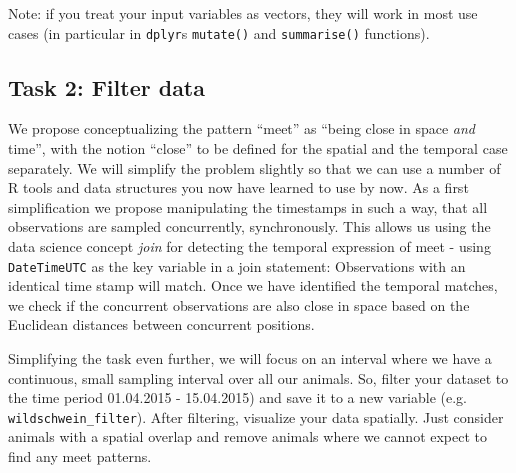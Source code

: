 \documentclass[]{book}
\newenvironment{Shaded}{\begin{snugshade}}{\end{snugshade}}
\newcommand{\DataTypeTok}[1]{\textcolor[rgb]{0.13,0.29,0.53}{#1}}
\newcommand{\FloatTok}[1]{\textcolor[rgb]{0.00,0.00,0.81}{#1}}
\newcommand{\KeywordTok}[1]{\textcolor[rgb]{0.13,0.29,0.53}{\textbf{#1}}}
\newcommand{\NormalTok}[1]{#1}
\newcommand{\OperatorTok}[1]{\textcolor[rgb]{0.81,0.36,0.00}{\textbf{#1}}}
\newcommand{\StringTok}[1]{\textcolor[rgb]{0.31,0.60,0.02}{#1}}
\begin{document}
Note: if you treat your input variables as vectors, they will work in most use cases (in particular in \texttt{dplyr}s \texttt{mutate()} and \texttt{summarise()} functions).

\hypertarget{task-2-filter-data}{%
\subsection{Task 2: Filter data}\label{task-2-filter-data}}

We propose conceptualizing the pattern ``meet'' as ``being close in space \emph{and} time'', with the notion ``close'' to be defined for the spatial and the temporal case separately. We will simplify the problem slightly so that we can use a number of R tools and data structures you now have learned to use by now. As a first simplification we propose manipulating the timestamps in such a way, that all observations are sampled concurrently, synchronously. This allows us using the data science concept \emph{join} for detecting the temporal expression of meet - using \texttt{DateTimeUTC} as the key variable in a join statement: Observations with an identical time stamp will match. Once we have identified the temporal matches, we check if the concurrent observations are also close in space based on the Euclidean distances between concurrent positions.

Simplifying the task even further, we will focus on an interval where we have a continuous, small sampling interval over all our animals. So, filter your dataset to the time period 01.04.2015 - 15.04.2015) and save it to a new variable (e.g. \texttt{wildschwein\_filter}). After filtering, visualize your data spatially. Just consider animals with a spatial overlap and remove animals where we cannot expect to find any meet patterns.

\begin{Shaded}
\end{Shaded}
\end{document}
